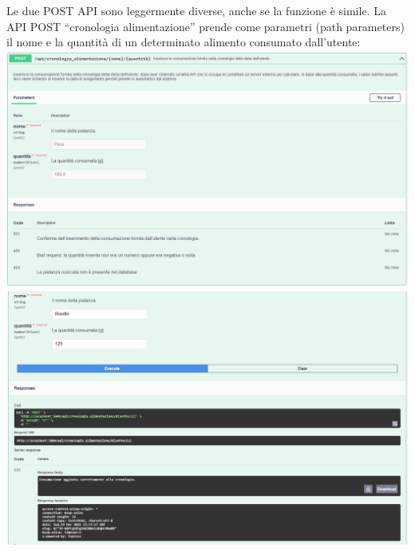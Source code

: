 \documentclass{article}
\begin{document}
   Le due POST API sono leggermente diverse, anche se la funzione è simile.
   La API POST “cronologia alimentazione” prende come parametri (path parameters) il nome e la quantità di un determinato alimento consumato dall’utente:\\
   \includegraphics[scale=0.5]{doc post cronologia_alimentazione.png}\\
   \includegraphics[scale=0.5]{risposta post cronologia_alimentazione.png}\\
\end{document}
